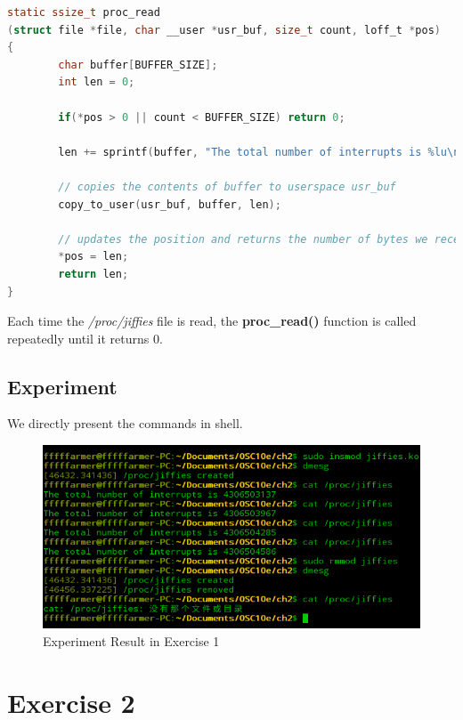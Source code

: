 \documentclass{article}
\begin{document}
    \begin{lstlisting}[language=c, caption={\textbf{proc\_read()}}]
static ssize_t proc_read
(struct file *file, char __user *usr_buf, size_t count, loff_t *pos)
{
        char buffer[BUFFER_SIZE];
        int len = 0;

        if(*pos > 0 || count < BUFFER_SIZE) return 0;
            
        len += sprintf(buffer, "The total number of interrupts is %lu\n", jiffies);

        // copies the contents of buffer to userspace usr_buf
        copy_to_user(usr_buf, buffer, len);

        // updates the position and returns the number of bytes we received
        *pos = len;
        return len;
}
    \end{lstlisting}

    \vspace{2pt}

    Each time the \textit{/proc/jiffies} file is read, the \textbf{proc\_read()} function is called repeatedly until it returns 0.

    \subsection*{Experiment}
    We directly present the commands in shell.

    \begin{figure}[h]
        \centering
        
        \includegraphics[width=17cm]{jiffies}
        \caption{Experiment Result in Exercise 1}
        \label{}
    \end{figure}

    \section*{Exercise 2}
\end{document}
